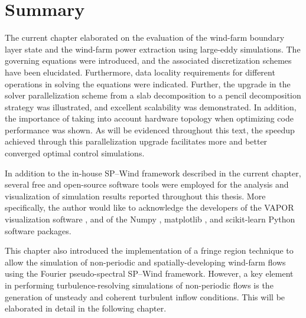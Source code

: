 \section{Summary}
The current chapter elaborated on the evaluation of the wind-farm boundary layer state and the wind-farm power extraction using large-eddy simulations. The governing equations were introduced, and the associated discretization schemes have been elucidated. Furthermore, data locality requirements for different operations in solving the equations were indicated. Further, the upgrade in the solver parallelization scheme from a slab decomposition to a pencil decomposition strategy was illustrated, and excellent scalability was demonstrated. In addition, the importance of taking into account hardware topology when optimizing code performance was shown.  As will be evidenced throughout this text, the speedup achieved through this parallelization upgrade facilitates more and better converged optimal control simulations. 

In addition to the in-house SP--Wind framework described in the current chapter, several free and open-source software tools were employed for the analysis and visualization of simulation results reported throughout this thesis. More specifically, the author would like to acknowledge the developers of the VAPOR visualization software \citep{vapor}, and of the Numpy \citep{numpy}, matplotlib \citep{matplotlib}, and scikit-learn \citep{scikit-learn} Python software packages. 

This chapter also introduced the implementation of a fringe region technique to allow the simulation of non-periodic and spatially-developing wind-farm flows using the Fourier pseudo-spectral SP--Wind framework. However, a key element in performing turbulence-resolving simulations of non-periodic flows is the generation of unsteady and coherent turbulent inflow conditions. This will be elaborated in detail in the following chapter. 

\cleardoublepage

